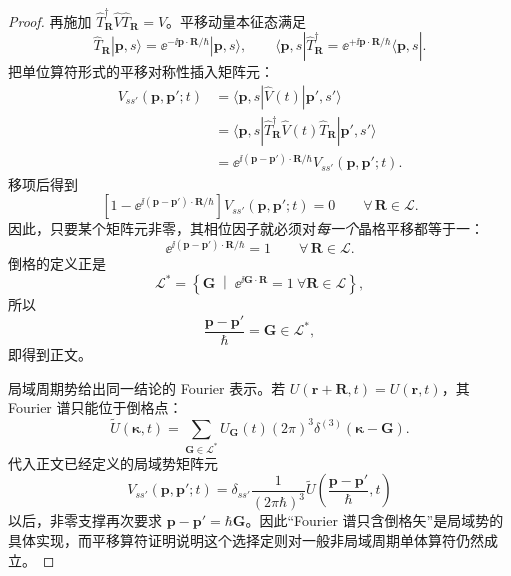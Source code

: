 \begin{proof}
再施加 $\hat T_{\mathbf R}^\dagger\hat V\hat T_{\mathbf R}=\hat V$。平移动量本征态满足
\begin{equation*}
\hat T_{\mathbf R}|\mathbf p,s\rangle
=\ee^{-\ii\mathbf p\cdot\mathbf R/\hbar}|\mathbf p,s\rangle,
\qquad
\langle\mathbf p,s|\hat T_{\mathbf R}^\dagger
=\ee^{+\ii\mathbf p\cdot\mathbf R/\hbar}
\langle\mathbf p,s|.
\end{equation*}
把单位算符形式的平移对称性插入矩阵元：
\begin{align*}
V_{ss'}(\mathbf p,\mathbf p';t)
&=\langle\mathbf p,s|\hat V(t)|\mathbf p',s'\rangle\\
&=\langle\mathbf p,s|\hat T_{\mathbf R}^\dagger
\hat V(t)\hat T_{\mathbf R}|\mathbf p',s'\rangle\\
&=\ee^{\ii(\mathbf p-\mathbf p')\cdot\mathbf R/\hbar}
V_{ss'}(\mathbf p,\mathbf p';t).
\end{align*}
移项后得到
\begin{equation*}
\left[
1-\ee^{\ii(\mathbf p-\mathbf p')\cdot\mathbf R/\hbar}
\right]
V_{ss'}(\mathbf p,\mathbf p';t)=0
\qquad
\forall\,\mathbf R\in\mathcal L.
\end{equation*}
因此，只要某个矩阵元非零，其相位因子就必须对\emph{每一个}晶格平移都等于一：
\begin{equation*}
\ee^{\ii(\mathbf p-\mathbf p')\cdot\mathbf R/\hbar}=1
\qquad
\forall\,\mathbf R\in\mathcal L.
\end{equation*}
倒格的定义正是
\begin{equation*}
\mathcal L^*
=\left\{\mathbf G\;\middle|\;
\ee^{\ii\mathbf G\cdot\mathbf R}=1
\ \forall\mathbf R\in\mathcal L\right\},
\end{equation*}
所以
\begin{equation*}
\frac{\mathbf p-\mathbf p'}{\hbar}=\mathbf G\in\mathcal L^*,
\end{equation*}
即得到正文。

局域周期势给出同一结论的 Fourier 表示。若 $U(\mathbf r+\mathbf R,t)=U(\mathbf r,t)$，其 Fourier 谱只能位于倒格点：
\begin{equation*}
\widetilde U(\boldsymbol\kappa,t)
=\sum_{\mathbf G\in\mathcal L^*}
U_{\mathbf G}(t)(2\pi)^3
\delta^{(3)}(\boldsymbol\kappa-\mathbf G).
\end{equation*}
代入正文已经定义的局域势矩阵元
\begin{equation*}
V_{ss'}(\mathbf p,\mathbf p';t)
=\delta_{ss'}\frac{1}{(2\pi\hbar)^3}
\widetilde U\!\left(\frac{\mathbf p-\mathbf p'}{\hbar},t\right)
\end{equation*}
以后，非零支撑再次要求
$\mathbf p-\mathbf p'=\hbar\mathbf G$。因此“Fourier 谱只含倒格矢”是局域势的具体实现，而平移算符证明说明这个选择定则对一般非局域周期单体算符仍然成立。
\end{proof}


